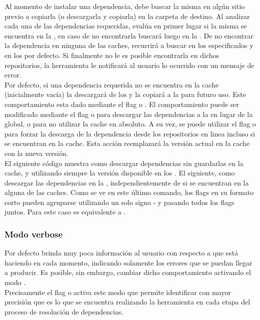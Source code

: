 Al momento de instalar una dependencia, \fronttier debe buscar la
misma en algún sitio previo a copiarla (o descargarla y copiarla)
en la carpeta de destino. Al analizar cada una de las dependencias
requeridas, \fronttier evalúa en primer lugar si la misma se encuentra
en la \cachel, en caso de no encontrarla buscará luego en la \cacheg. De
no encontrar la dependencia en ninguna de las caches, recurrirá a buscar
en los \onlinerepo especificados y en los por defecto. Si finalmente no
le es posible encontrarla en dichos repositorios, la herramienta le
notificará al usuario lo ocurrido con un mensaje de error.\\
Por defecto, si una dependencia requerida no se encuentra en la cache
(inicialmente vacía) \fronttier la descargará de los \onlinerepo 
y la copiará a la \cacheg para futuro uso. Este comportamiento esta
dado mediante el flag  o . El comportamiento
puede ser modificado mediante el flag  o  para
descargar las dependencias a la \cachel en lugar de la global, o
 para no utilizar la cache en absoluto. A su vez, se
puede utilizar el flag  o  para forzar la
descarga de la dependencia desde los repositorios en linea incluso si
se encuentran en la cache. Esta acción reemplazará la versión actual en
la cache con la nueva versión.\\
El siguiente código muestra como descargar dependencias sin guardarlas
en la cache, y utilizando siempre la versión disponible en los
\onlinerepo.
El siguiente, como descargar las dependencias en la \cachel,
independientemente de si se encuentran en la alguna de las caches.
Como se ve en este último comando, los flags en su formato corto pueden
agruparse utilizando un solo signo - y pasando todos los flags
juntos. Para este caso  es equivalente a  .


\subsubsection{Modo verbose}
\label{subsubsec:guide:verbose}

Por defecto \fronttier brinda muy poca información al usuario con respecto a
que está haciendo en cada momento, indicando solamente los errores
que se puedan llegar a producir. Es posible, sin embargo, cambiar dicho
comportamiento activando el modo .\\
Precisamente el flag  o  activa este modo que permite
identificar con mayor precisión que es lo que se encuentra realizando la
herramienta en cada etapa del proceso de resolución de dependencias.\\


